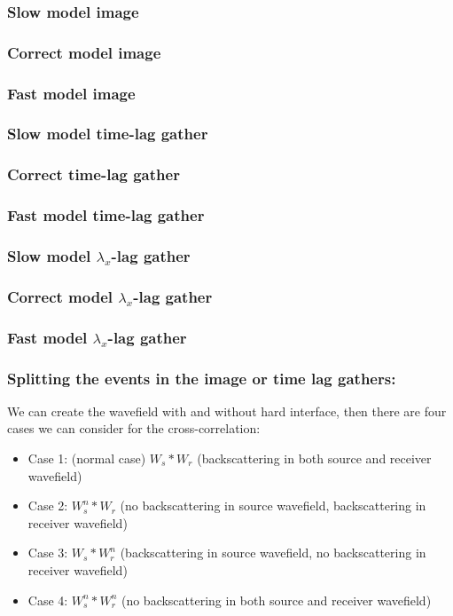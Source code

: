 \begin{frame} \frametitle{Slow model image    }  \end{frame}
\begin{frame} \frametitle{Correct model image}  \end{frame}
\begin{frame} \frametitle{Fast model image     }  \end{frame}

\begin{frame} \frametitle{Slow model time-lag gather}  \end{frame}
\begin{frame} \frametitle{Correct time-lag  gather}  \end{frame}
\begin{frame} \frametitle{Fast model time-lag  gather}  \end{frame}

\begin{frame} \frametitle{Slow model $\lambda_x$-lag gather}  \end{frame}
\begin{frame} \frametitle{Correct model $\lambda_x$-lag gather}  \end{frame}
\begin{frame} \frametitle{Fast model $\lambda_x$-lag gather}  \end{frame}


\begin{frame} \frametitle{ Splitting the events in the image or time lag gathers:}

We can create the wavefield with and without hard interface, then there are four cases we can consider for the cross-correlation: 

\begin{itemize}
	\item Case 1: (normal case) $W_{s}* W_{r}$ (backscattering in both source and receiver wavefield)
	\item Case 2: $W_{s}^{n} * W_{r}$ (no backscattering in source wavefield, backscattering in receiver wavefield)
	\item Case 3: $W_{s} * W_{r}^{n}$ (backscattering in source wavefield, no backscattering in receiver wavefield)
	\item Case 4: $W_{s}^{n} * W_{r}^{n}$ (no backscattering in both source and receiver wavefield)
\end{itemize}
\end{frame}



